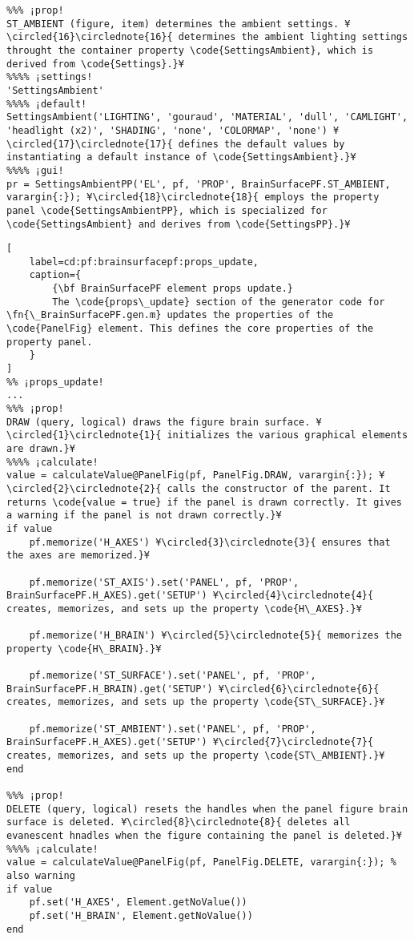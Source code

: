 \documentclass{tufte-handout}
\begin{document}
\begin{lstlisting}
%%% ¡prop!
ST_AMBIENT (figure, item) determines the ambient settings. ¥\circled{16}\circlednote{16}{ determines the ambient lighting settings throught the container property \code{SettingsAmbient}, which is derived from \code{Settings}.}¥
%%%% ¡settings!
'SettingsAmbient'
%%%% ¡default!
SettingsAmbient('LIGHTING', 'gouraud', 'MATERIAL', 'dull', 'CAMLIGHT', 'headlight (x2)', 'SHADING', 'none', 'COLORMAP', 'none') ¥\circled{17}\circlednote{17}{ defines the default values by instantiating a default instance of \code{SettingsAmbient}.}¥
%%%% ¡gui!
pr = SettingsAmbientPP('EL', pf, 'PROP', BrainSurfacePF.ST_AMBIENT, varargin{:}); ¥\circled{18}\circlednote{18}{ employs the property panel \code{SettingsAmbientPP}, which is specialized for \code{SettingsAmbient} and derives from \code{SettingsPP}.}¥
\end{lstlisting}

\begin{lstlisting}[
	label=cd:pf:brainsurfacepf:props_update,
	caption={
		{\bf BrainSurfacePF element props update.}
		The \code{props\_update} section of the generator code for \fn{\_BrainSurfacePF.gen.m} updates the properties of the \code{PanelFig} element. This defines the core properties of the property panel.
	}
]
%% ¡props_update!
...
%%% ¡prop!
DRAW (query, logical) draws the figure brain surface. ¥\circled{1}\circlednote{1}{ initializes the various graphical elements are drawn.}¥
%%%% ¡calculate!
value = calculateValue@PanelFig(pf, PanelFig.DRAW, varargin{:}); ¥\circled{2}\circlednote{2}{ calls the constructor of the parent. It returns \code{value = true} if the panel is drawn correctly. It gives a warning if the panel is not drawn correctly.}¥
if value
    pf.memorize('H_AXES') ¥\circled{3}\circlednote{3}{ ensures that the axes are memorized.}¥

    pf.memorize('ST_AXIS').set('PANEL', pf, 'PROP', BrainSurfacePF.H_AXES).get('SETUP') ¥\circled{4}\circlednote{4}{ creates, memorizes, and sets up the property \code{H\_AXES}.}¥
    
    pf.memorize('H_BRAIN') ¥\circled{5}\circlednote{5}{ memorizes the property \code{H\_BRAIN}.}¥

    pf.memorize('ST_SURFACE').set('PANEL', pf, 'PROP', BrainSurfacePF.H_BRAIN).get('SETUP') ¥\circled{6}\circlednote{6}{ creates, memorizes, and sets up the property \code{ST\_SURFACE}.}¥
    
    pf.memorize('ST_AMBIENT').set('PANEL', pf, 'PROP', BrainSurfacePF.H_AXES).get('SETUP') ¥\circled{7}\circlednote{7}{ creates, memorizes, and sets up the property \code{ST\_AMBIENT}.}¥
end

%%% ¡prop!
DELETE (query, logical) resets the handles when the panel figure brain surface is deleted. ¥\circled{8}\circlednote{8}{ deletes all evanescent hnadles when the figure containing the panel is deleted.}¥
%%%% ¡calculate!
value = calculateValue@PanelFig(pf, PanelFig.DELETE, varargin{:}); % also warning
if value
    pf.set('H_AXES', Element.getNoValue())
    pf.set('H_BRAIN', Element.getNoValue())
end
\end{lstlisting}
\end{document}
